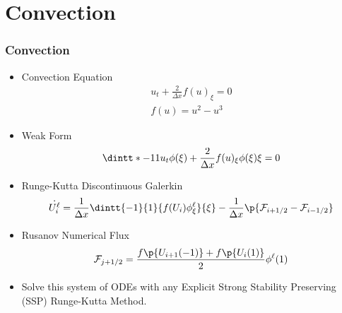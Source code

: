 \documentclass[10pt]{beamer}
\begin{document}
  \section{Convection}
    \begin{frame}
      \frametitle{Convection}
      \begin{itemize}
        \item Convection Equation
          \begin{gather*}
            u_t + \frac{2}{\Delta x} f(u)_\xi = 0 \\
            f(u) = u^2 - u^3
          \end{gather*}

        \item Weak Form
          \[
            \dintt*{-1}{1}{u_t \phi(\xi) + \frac{2}{\Delta x}f(u)_\xi \phi(\xi)}{\xi} = 0
          \]

        \item Runge-Kutta Discontinuous Galerkin
          \[
            \dot{U_i^{\ell}} = \frac{1}{\Delta x}\dintt{-1}{1}{f(U_i)\phi_{\xi}^{\ell}}{\xi} - \frac{1}{\Delta x} \p{\mcF_{i + 1/2} - \mcF_{i - 1/2}}
          \]

        \item Rusanov Numerical Flux
          \[
            \mcF_{j+1/2} = \frac{f\p{U_{i+1}(-1)} + f\p{U_{i}(1)}}{2} \phi^{\ell}(1)
          \]

        \item Solve this system of ODEs with any Explicit Strong Stability Preserving (SSP) Runge-Kutta Method.
      \end{itemize}
    \end{frame}
\end{document}
